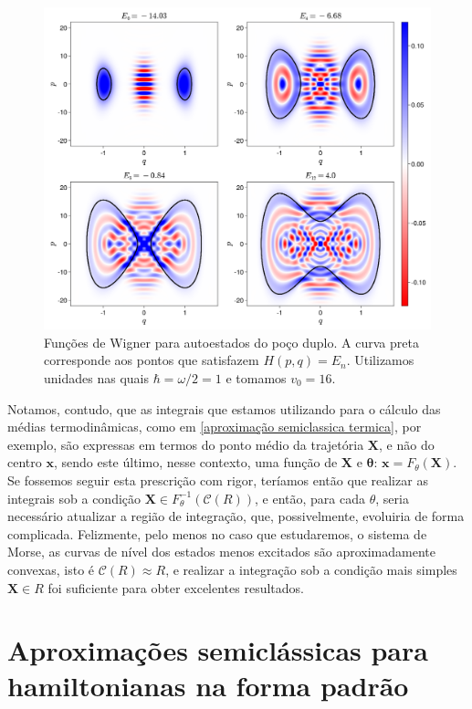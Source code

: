 \documentclass[
	12pt,
	oneside,			%
	a4paper,			%
	english,			%
	brazil				%
	]{abntex2}
\theoremstyle{definition}
\begin{document}
\begin{figure}[H]
    \includegraphics[width=\textwidth]{Imagens/wigner_double_well.png}
    \centering
    \caption{Funções de Wigner para autoestados do poço duplo. A curva preta corresponde aos pontos que satisfazem $H(p,q) = E_n$. Utilizamos unidades nas quais $\hbar = \omega/2 = 1$ e tomamos $v_0 = 16$.}
    \label{autoestados poço duplo}
\end{figure}

Notamos, contudo, que as integrais que estamos utilizando para o cálculo das médias termodinâmicas, como em \eqref{aproximação semiclassica termica}, por exemplo, são expressas em termos do ponto médio da trajetória $\mathbf{X}$, e não do centro $\mathbf{x}$, sendo este último, nesse contexto, uma função de $\mathbf{X}$ e $\mathbf{\theta}$: $\mathbf{x} = F_\theta (\mathbf{X})$. Se fossemos seguir esta prescrição com rigor, teríamos então que realizar as integrais sob a condição $\mathbf{X} \in F_\theta^{-1} (\mathcal{C}(R))$, e então, para cada $\theta$, seria necessário atualizar a região de integração, que, possivelmente, evoluiria de forma complicada. Felizmente, pelo menos no caso que estudaremos, o sistema de Morse, as curvas de nível dos estados menos excitados são aproximadamente convexas, isto é $\mathcal{C}(R) \approx R$, e realizar a integração sob a condição mais simples $\mathbf{X} \in R$ foi suficiente para obter excelentes resultados.

\section{Aproximações semiclássicas para hamiltonianas na forma padrão}
\end{document}
